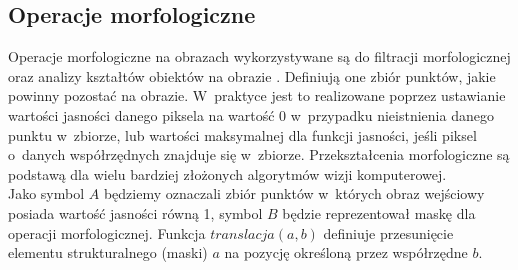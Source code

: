 \subsection{Operacje morfologiczne}
Operacje morfologiczne na obrazach wykorzystywane są do filtracji morfologicznej oraz analizy kształtów obiektów na obrazie \cite{soille03}. Definiują one zbiór punktów, jakie powinny pozostać na obrazie. W~praktyce jest to realizowane poprzez ustawianie wartości jasności danego piksela na wartość 0 w~przypadku nieistnienia danego punktu w~zbiorze, lub wartości maksymalnej dla funkcji jasności, jeśli piksel o~danych współrzędnych znajduje się w~zbiorze. Przekształcenia morfologiczne są podstawą dla wielu bardziej złożonych algorytmów wizji komputerowej.\\
Jako symbol $A$ będziemy oznaczali zbiór punktów w~których obraz wejściowy posiada wartość jasności równą 1, symbol $B$ będzie reprezentował maskę dla operacji morfologicznej. Funkcja $translacja(a, b)$ definiuje przesunięcie elementu strukturalnego (maski) $a$ na pozycję określoną przez współrzędne $b$.
